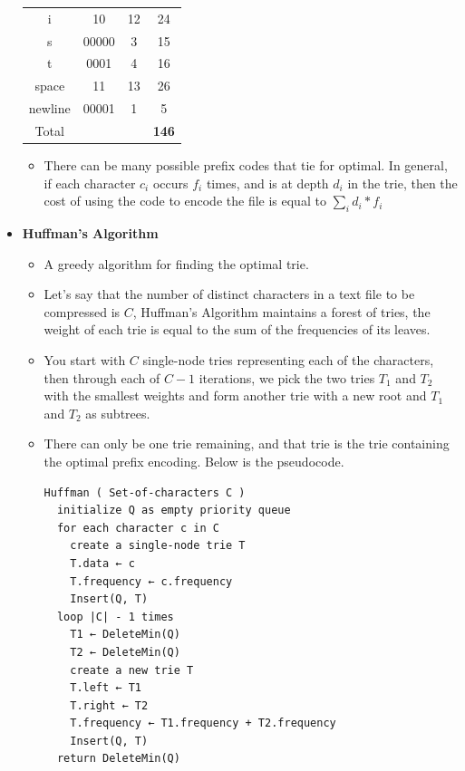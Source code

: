 \documentclass{article}
\begin{document}
\begin{itemize}
\begin{center}
\begin{tabular}{|c c c c|}
    i & 10 & 12 & 24 \\
    s & 00000 & 3 & 15 \\
    t & 0001 & 4 & 16 \\
    space & 11 & 13 & 26 \\
    newline & 00001 & 1 & 5 \\
    Total & & & \textbf{146} \\
    \hline
    \end{tabular}
    \end{center}
    \begin{itemize}
        \item There can be many possible prefix codes that tie for optimal. In general, if each character \(c_i\) occurs \(f_i\) times, and is at depth \(d_i\) in the trie, then the cost of using the code to encode the file is equal to \(\sum_i d_i*f_i\)
    \end{itemize}
    \item \textbf{Huffman's Algorithm}
    \begin{itemize}
        \item A greedy algorithm for finding the optimal trie.
        \item Let's say that the number of distinct characters in a text file to be compressed is \(C\), Huffman's Algorithm maintains a forest of tries, the weight of each trie is equal to the sum of the frequencies of its leaves.
        \item You start with \(C\) single-node tries representing each of the characters, then through each of \(C-1\) iterations, we pick the two tries \(T_1\) and \(T_2\) with the smallest weights and form another trie with a new root and \(T_1\) and \(T_2\) as subtrees.
        \item There can only be one trie remaining, and that trie is the trie containing the optimal prefix encoding. Below is the pseudocode.
\begin{verbatim}
Huffman ( Set-of-characters C )
  initialize Q as empty priority queue
  for each character c in C
    create a single-node trie T
    T.data ← c
    T.frequency ← c.frequency
    Insert(Q, T)
  loop |C| - 1 times
    T1 ← DeleteMin(Q)
    T2 ← DeleteMin(Q)
    create a new trie T
    T.left ← T1
    T.right ← T2
    T.frequency ← T1.frequency + T2.frequency
    Insert(Q, T)
  return DeleteMin(Q)
\end{verbatim}
    \end{itemize}
\end{itemize}
\end{document}
